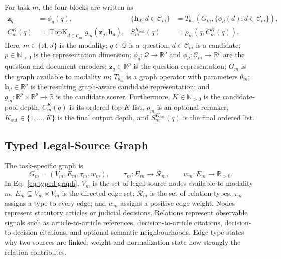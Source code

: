 \documentclass[runningheads]{llncs}
\begin{document}
For task \(m\), the four blocks are written as
\begin{align}
  \mathbf{z}_q&=\phi_q(q),
  &\{\mathbf{h}_d:d\in\mathcal{C}_m\}
  &=T_{\theta_m}\!\left(G_m,\{\phi_d(d):d\in\mathcal{C}_m\}\right),
  \label{eq:encoding-propagation}\\
  C_m^K(q)&=\operatorname{TopK}_{d\in\mathcal{C}_m}
  g_m(\mathbf{z}_q,\mathbf{h}_d),
  &S_m^{K_{\mathrm{out}}}(q)&=\rho_m\!\left(q,C_m^K(q)\right).
  \label{eq:retrieval-reranking}
\end{align}
Here, \(m\in\{A,J\}\) is the modality; \(q\in\mathcal{Q}\) is a question; \(d\in\mathcal{C}_m\) is a candidate; \(p\in\mathbb{N}_{>0}\) is the representation dimension; \(\phi_q:\mathcal{Q}\rightarrow\mathbb{R}^{p}\) and \(\phi_d:\mathcal{C}_m\rightarrow\mathbb{R}^{p}\) are the question and document encoders; \(\mathbf{z}_q\in\mathbb{R}^{p}\) is the question representation; \(G_m\) is the graph available to modality \(m\); \(T_{\theta_m}\) is a graph operator with parameters \(\theta_m\); \(\mathbf{h}_d\in\mathbb{R}^{p}\) is the resulting graph-aware candidate representation; and \(g_m:\mathbb{R}^{p}\times\mathbb{R}^{p}\rightarrow\mathbb{R}\) is the candidate scorer. Furthermore, \(K\in\mathbb{N}_{>0}\) is the candidate-pool depth, \(C_m^K(q)\) is its ordered top-\(K\) list, \(\rho_m\) is an optional reranker, \(K_{\mathrm{out}}\in\{1,\ldots,K\}\) is the final output depth, and \(S_m^{K_{\mathrm{out}}}(q)\) is the final ordered list.

\subsection{Typed Legal-Source Graph}

The task-specific graph is
\begin{equation}
  G_m=(V_m,E_m,\tau_m,w_m),
  \qquad
  \tau_m:E_m\rightarrow\mathcal{R}_m,
  \qquad
  w_m:E_m\rightarrow\mathbb{R}_{>0}.
  \label{eq:typed-graph}
\end{equation}
In Eq.~\eqref{eq:typed-graph}, \(V_m\) is the set of legal-source nodes available to modality \(m\); \(E_m\subseteq V_m\times V_m\) is the directed edge set; \(\mathcal{R}_m\) is the set of relation types; \(\tau_m\) assigns a type to every edge; and \(w_m\) assigns a positive edge weight. Nodes represent statutory articles or judicial decisions. Relations represent observable signals such as article-to-article references, decision-to-article citations, decision-to-decision citations, and optional semantic neighbourhoods. Edge type states why two sources are linked; weight and normalization state how strongly the relation contributes.
\end{document}
